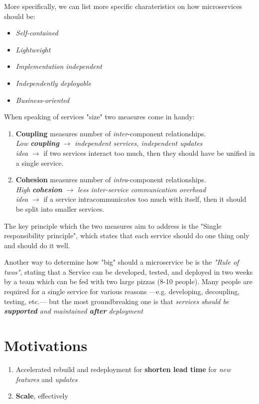 More specifically, we can list more specific charateristics on how microservices should be:
\begin{itemize}
   \item \textit{Self-contained}
   \item \textit{Lightweight}
   \item \textit{Implementation independent}
   \item \textit{Independently deployable}
   \item \textit{Business-oriented}
\end{itemize}

When speaking of services "size" two measures come in handy:
\begin{enumerate}
   \item 
   \textbf{Coupling} measures number of \textit{inter}-component relationships.\\
   \textit{Low \textbf{coupling}} $\longrightarrow$ \textit{independent services, independent updates}\\
   \textit{idea} $\longrightarrow$ if two services interact too much, then they should have be unified in a single service.
   \item \textbf{Cohesion} measures number of \textit{intra}-component relationships.\\
   \textit{High \textbf{cohesion}} $\longrightarrow$ \textit{less inter-service communication overhead}\\
   \textit{idea} $\longrightarrow$ if a service intracommunicates too much with itself, then it should be split into smaller services.
\end{enumerate}
The key principle which the two measures aim to address is the "Single responsibility principle",
which states that each service should do one thing only and should do it well.

Another way to determine how "big" should a microservice be is the \textit{"Rule of twos"}, stating that a Service can be developed, tested, and deployed in two weeks by a team which can be fed with two large pizzas (8-10 people).
Many people are required for a single service for various reasons {---}e.g. developing, decoupling, testing, etc.{---} but
the most groundbreaking one is that \emph{services should be \textbf{supported} and maintained \textbf{after} deployment}

\section{Motivations}
\begin{enumerate}
   \item Accelerated rebuild and redeployment for \textbf{shorten lead time} for \textit{new features} and \textit{updates}
   \item \textbf{Scale}, effectively
\end{enumerate}


